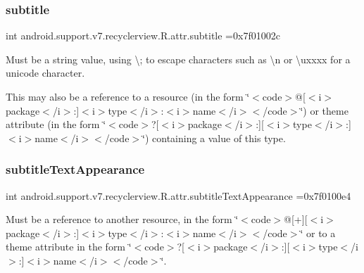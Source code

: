 \subsubsection{\texorpdfstring{subtitle}{subtitle}}
{\footnotesize\ttfamily int android.\+support.\+v7.\+recyclerview.\+R.\+attr.\+subtitle =0x7f01002c\hspace{0.3cm}{\ttfamily [static]}}

Must be a string value, using \textquotesingle{}\textbackslash{};\textquotesingle{} to escape characters such as \textquotesingle{}\textbackslash{}n\textquotesingle{} or \textquotesingle{}\textbackslash{}uxxxx\textquotesingle{} for a unicode character. 

This may also be a reference to a resource (in the form \char`\"{}$<$code$>$@\mbox{[}$<$i$>$package$<$/i$>$\+:\mbox{]}$<$i$>$type$<$/i$>$\+:$<$i$>$name$<$/i$>$$<$/code$>$\char`\"{}) or theme attribute (in the form \char`\"{}$<$code$>$?\mbox{[}$<$i$>$package$<$/i$>$\+:\mbox{]}\mbox{[}$<$i$>$type$<$/i$>$\+:\mbox{]}$<$i$>$name$<$/i$>$$<$/code$>$\char`\"{}) containing a value of this type. \mbox{\label{classandroid_1_1support_1_1v7_1_1recyclerview_1_1R_1_1attr_ae024e7c9115919d63dff8b958fafd01d}} 
\subsubsection{\texorpdfstring{subtitle\+Text\+Appearance}{subtitleTextAppearance}}
{\footnotesize\ttfamily int android.\+support.\+v7.\+recyclerview.\+R.\+attr.\+subtitle\+Text\+Appearance =0x7f0100e4\hspace{0.3cm}{\ttfamily [static]}}

Must be a reference to another resource, in the form \char`\"{}$<$code$>$@\mbox{[}+\mbox{]}\mbox{[}$<$i$>$package$<$/i$>$\+:\mbox{]}$<$i$>$type$<$/i$>$\+:$<$i$>$name$<$/i$>$$<$/code$>$\char`\"{} or to a theme attribute in the form \char`\"{}$<$code$>$?\mbox{[}$<$i$>$package$<$/i$>$\+:\mbox{]}\mbox{[}$<$i$>$type$<$/i$>$\+:\mbox{]}$<$i$>$name$<$/i$>$$<$/code$>$\char`\"{}. \mbox{\label{classandroid_1_1support_1_1v7_1_1recyclerview_1_1R_1_1attr_a135168eb14d631fd93d4e8e20e659f73}} 
